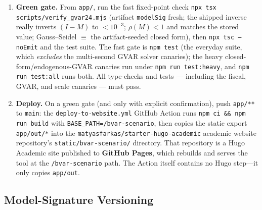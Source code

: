 \documentclass[11pt]{article}
\theoremstyle{definition}
\theoremstyle{remark}
\begin{document}
\begin{enumerate}
    \texttt{npx vite-node
    scripts/\allowbreak precompute\_\allowbreak gvar\_\allowbreak coupling.mjs}.
    It builds the
    Kalman-probe operator $M$ in JS, inverts $(I-M)$ via LAPACK
    (\texttt{invert\_coupling.m} in MATLAB, or the \texttt{invert\_coupling.py}
    NumPy fallback), and writes the gzipped
    \texttt{public/\allowbreak data/\allowbreak bvar/\allowbreak gvar/\allowbreak coupling\_\allowbreak default.json.gz} (the plain
    \texttt{.json} is removed --- at this bloc count the raw artifact exceeds
    GitHub's 100\,MB per-file limit, so only the \texttt{.gz} is shipped and the
    loader decompresses it via the browser's \texttt{DecompressionStream}).
  \item \textbf{Green gate.} From \texttt{app/}, run the fast fixed-point check
    \texttt{npx tsx scripts/verify\_gvar24.mjs} (artifact \texttt{modelSig}
    fresh; the shipped inverse really inverts $(I-M)$ to $<10^{-3}$;
    $\rho(M)<1$ and matches the stored value; Gauss--Seidel $\equiv$ the
    artifact-seeded closed form), then \texttt{npx tsc --noEmit} and the test
    suite. The fast gate is \texttt{npm test} (the everyday suite, which
    \emph{excludes} the multi-second GVAR solver canaries); the heavy
    closed-form/endogenous-GVAR canaries run under
    \texttt{npm run test:heavy}, and \texttt{npm run test:all} runs both.
    All type-checks and tests --- including the fiscal, GVAR, and scale
    canaries --- must pass.
  \item \textbf{Deploy.} On a green gate (and only with explicit confirmation),
    push \texttt{app/**} to \texttt{main}: the
    \texttt{deploy-to-website.yml} GitHub Action runs
    \texttt{npm ci \&\& npm run build} with \texttt{BASE\_PATH=/bvar-scenario},
    then copies the static export \texttt{app/out/*} into the
    \texttt{matyasfarkas/starter-hugo-academic} academic website repository's
    \texttt{static/bvar-scenario/} directory. That repository is a Hugo Academic
    site published to \textbf{GitHub Pages}, which rebuilds and serves
    the tool at the \texttt{/bvar-scenario} path. The Action itself contains no
    Hugo step---it only copies \texttt{app/out}.
\end{enumerate}

\subsection{Model-Signature Versioning}\label{sec:repro:modelsig}
\end{document}
